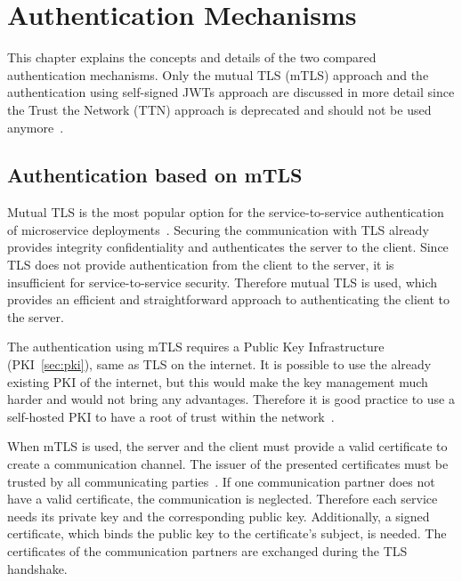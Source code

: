 \chapter{Authentication Mechanisms}
\label{cha:authentication_mechanisms}
This chapter explains the concepts and details of the two compared authentication mechanisms.
Only the mutual TLS (mTLS) approach and the authentication using self-signed JWTs approach are discussed in more detail since the Trust the Network (TTN) approach is deprecated and should not be used anymore~\cite{dias2020microservices}.


\section{Authentication based on mTLS}
Mutual TLS is the most popular option for the service-to-service authentication of microservice deployments~\cite{dias2020microservices}.
Securing the communication with TLS already provides integrity confidentiality and authenticates the server to the client.
Since TLS does not provide authentication from the client to the server, it is insufficient for service-to-service security.
Therefore mutual TLS is used, which provides an efficient and straightforward approach to authenticating the client to the server.

The authentication using mTLS requires a Public Key Infrastructure (PKI~\ref{sec:pki}), same as TLS on the internet.
It is possible to use the already existing PKI of the internet, but this would make the key management much harder and would not bring any advantages.
Therefore it is good practice to use a self-hosted PKI to have a root of trust within the network~\cite{dias2020microservices}.

When mTLS is used, the server and the client must provide a valid certificate to create a communication channel.
The issuer of the presented certificates must be trusted by all communicating parties~\cite{dias2020microservices}.
If one communication partner does not have a valid certificate, the communication is neglected.
Therefore each service needs its private key and the corresponding public key.
Additionally, a signed certificate, which binds the public key to the certificate's subject, is needed.
The certificates of the communication partners are exchanged during the TLS handshake.

